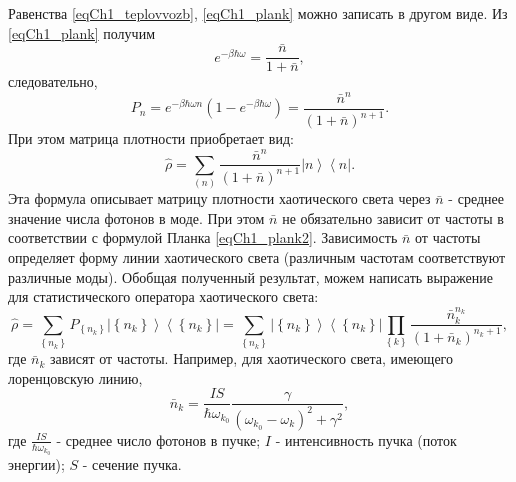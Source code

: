 Равенства \eqref{eqCh1_teplovvozb}, \eqref{eqCh1_plank} можно записать в
другом виде. Из \eqref{eqCh1_plank} получим 
\[
e^{-\beta \hbar \omega} = \frac{\bar{n}}{1 + \bar{n}},
\]
следовательно, 
\begin{equation}
P_n = e^{-\beta \hbar \omega n} \left(1  -  e^{-\beta \hbar
  \omega}\right) = \frac{\bar{n}^n}{\left(1 + \bar{n}\right)^{n+1}}.
\label{eqCh1_plank2}
\end{equation}
При этом матрица плотности 
приобретает вид:
\[
\hat{\rho} = \sum_{(n)}\frac{\bar{n}^n}{\left(1 + \bar{n}\right)^{n+1}}\left|n\right>\left<n\right|.
\]
Эта формула описывает матрицу плотности хаотического света через
$\bar{n}$ -  среднее значение числа фотонов в моде. При этом
$\bar{n}$ не обязательно зависит от частоты в соответствии с формулой
Планка \eqref{eqCh1_plank2}. Зависимость $\bar{n}$ от частоты
определяет форму линии хаотического света (различным частотам
соответствуют различные моды). Обобщая полученный результат, можем
написать выражение для статистического оператора хаотического света:  
\begin{equation}
\hat{\rho} = \sum_{\left\{n_k\right\}} P_{\left\{n_k\right\}} \left|\left\{n_k\right\}\right>\left<\left\{n_k\right\}\right| = 
\sum_{\left\{n_k\right\}} 
 \left|\left\{n_k\right\}\right>\left<\left\{n_k\right\}\right|
\prod_{\left\{k\right\}} 
\frac{\bar{n}_k^{n_k}}{\left(1 + \bar{n}_k\right)^{n_k+1}},
\label{eqCh1_102}
\end{equation}
где $\bar{n}_k$  зависят от частоты. Например, для хаотического света,
имеющего лоренцовскую линию, 
\[
\bar{n}_k = \frac{I S}{\hbar \omega_{k_0}}
\frac{\gamma}{\left(\omega_{k_0} - \omega_{k}\right)^2 + \gamma^2},
\]
где $\frac{I S}{\hbar \omega_{k_0}}$   -  среднее число фотонов в
пучке;  $I$ -  интенсивность пучка (поток энергии);  $S$ -  сечение
пучка.  
